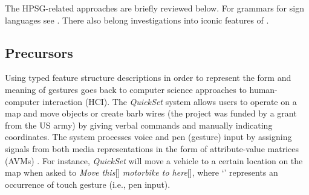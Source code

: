 \documentclass[output=paper]{langsci/langscibook}
\begin{document}
The HPSG-related approaches are briefly reviewed below.
%
For grammars for sign languages see . 
%
There also belong investigations into iconic features of  \citep{Schlenker:Lamberton:Santoro:2013,Schlenker:2014}.



\subsection{Precursors} 
\label{sec:precursors}

Using typed feature structure descriptions in order to represent the form and meaning of gestures goes back to computer science approaches to human-computer interaction (HCI). %
%
The \textit{QuickSet} system  \citep{Cohen:et:al:1997} allows users to operate on a map and move objects or create barb wires (the project was funded by a grant from the US army) by giving verbal commands and manually indicating coordinates.
%
The system processes voice and pen (gesture) input by assigning signals from both media representations in the form of attribute-value matrices (AVMs) \citep{Johnston:1998,Johnston:et:al:1997}.
%
For instance, \textit{QuickSet} will move a vehicle to a certain location on the map when asked to \emph{Move this}[\Pointing] \emph{motorbike to here}[\Pointing], where \enquote*{\Pointing} represents an occurrence of touch gesture (i.e., pen input). 
\end{document}
